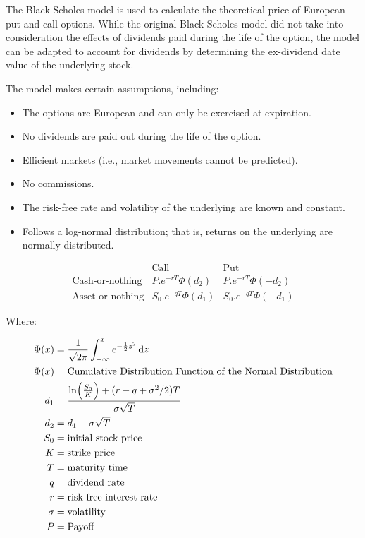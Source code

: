 \documentclass[]{elsarticle}
\theoremstyle{definition}
\theoremstyle{remark}
\begin{document}
The Black-Scholes model is used to calculate the theoretical price of European put and call options. While the original Black-Scholes model did not take into consideration the effects of dividends paid during the life of the option, the model can be adapted to account for dividends by determining the ex-dividend date value of the underlying stock.

The model makes certain assumptions, including:
\begin{itemize}
\item The options are European and can only be exercised at expiration.
\item No dividends are paid out during the life of the option.
\item Efficient markets (i.e., market movements cannot be predicted).
\item No commissions.
\item The risk-free rate and volatility of the underlying are known and constant.
\item Follows a log-normal distribution; that is, returns on the underlying are normally distributed.
\end{itemize}

$$\begin{array}{rcc}
& \text{Call}  & \text{Put} \\
\text{Cash-or-nothing} & P.e^{-rT}\Phi(d_2) & P.e^{-rT}\Phi(-d_2) \\
\text{Asset-or-nothing} & S_0.e^{-qT}\Phi(d_1) & S_0.e^{-qT}\Phi(-d_1)
\end{array}$$

Where:

\begin{align*}
\Phi(x) & =\frac{1}{\sqrt{2\pi}}\int_{-\infty}^{x}e^{-\frac{1}{2}z^2} \, 
{\rm
d}z \\
\Phi(x) & = \text{Cumulative Distribution Function of the Normal 
Distribution} \\ 
d_1 &=\frac{\ln \Bigl(\frac{S_0}{K} \Bigr)+(r-q+\sigma^2/2)T}
{\sigma\sqrt{T}} \\
d_2 &=d_1-\sigma\sqrt{T} \\
S_0 & = \text{initial stock price} \\
K & = \text{strike price}\\
T & = \text{maturity time}\\
q & = \text{dividend rate}\\
r & = \text{risk-free interest rate}\\
\sigma & = \text{volatility}\\
P & = \text{Payoff}\\
\end{align*}
\end{document}
